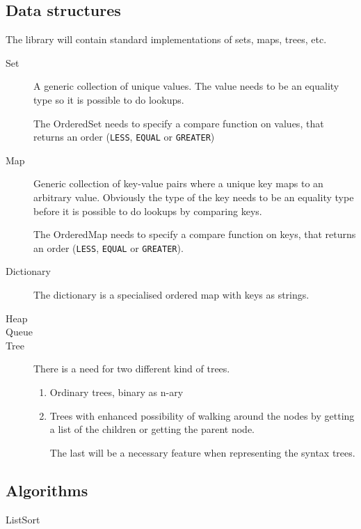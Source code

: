 \subsection*{Data structures}

The library will contain standard implementations of sets, maps, trees, etc.

\begin{description}
\item[Set] A generic collection of unique values. The value needs to be an
  equality type so it is possible to do lookups.

  The OrderedSet needs to specify a compare function on values, that returns an
  order (\texttt{LESS}, \texttt{EQUAL} or \texttt{GREATER})

\item[Map] Generic collection of key-value pairs where a unique key maps to an arbitrary
  value. Obviously the type of the key needs to be an equality type before it is
  possible to do lookups by comparing keys.

  The OrderedMap needs to specify a compare function on keys, that returns an
  order (\texttt{LESS}, \texttt{EQUAL} or \texttt{GREATER}).

\item[Dictionary] The dictionary is a specialised ordered map with keys as
  strings.



\item[Heap] 

\item[Queue] 

\item[Tree] 

  
  There is a need for two different kind of trees.
  
  \begin{enumerate}
  \item Ordinary trees, binary as n-ary
    
  \item Trees with enhanced possibility of walking around the nodes by getting a
    list of the children or getting the parent node.
    
    The last will be a necessary feature when representing the syntax trees.

  \end{enumerate}
\end{description}


\subsection*{Algorithms}

\begin{description}
\item[ListSort] 

\end{description}


